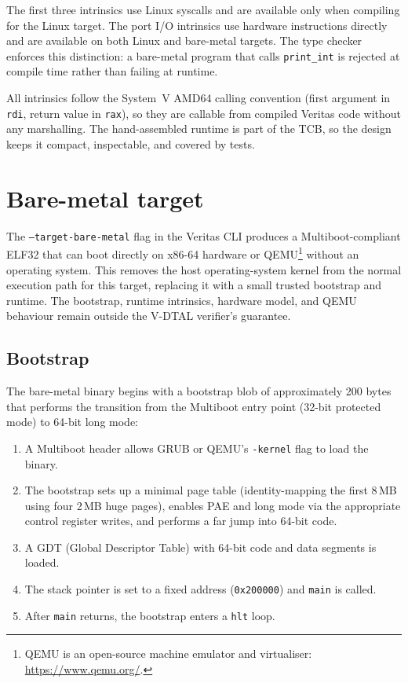 The first three intrinsics use Linux syscalls and are available only when compiling for the Linux target. The port I/O intrinsics use hardware instructions directly and are available on both Linux and bare-metal targets. The type checker enforces this distinction: a bare-metal program that calls \texttt{print\_int} is rejected at compile time rather than failing at runtime.

All intrinsics follow the System~V AMD64 calling convention (first argument in \texttt{rdi}, return value in \texttt{rax}), so they are callable from compiled Veritas code without any marshalling. The hand-assembled runtime is part of the TCB, so the design keeps it compact, inspectable, and covered by tests.

\section{Bare-metal target}\label{sec:unikernel}

The \texttt{--target-bare-metal} flag in the Veritas CLI produces a Multiboot-compliant ELF32 that can boot directly on x86-64 hardware or QEMU\footnote{QEMU is an open-source machine emulator and virtualiser: \url{https://www.qemu.org/}.} without an operating system. This removes the host operating-system kernel from the normal execution path for this target, replacing it with a small trusted bootstrap and runtime. The bootstrap, runtime intrinsics, hardware model, and QEMU behaviour remain outside the V-DTAL verifier's guarantee.

\subsection{Bootstrap}

The bare-metal binary begins with a bootstrap blob of approximately 200 bytes that performs the transition from the Multiboot entry point (32-bit protected mode) to 64-bit long mode:

\begin{enumerate}
  \item A Multiboot header allows GRUB or QEMU's \texttt{-kernel} flag to load the binary.
  \item The bootstrap sets up a minimal page table (identity-mapping the first 8\,MB using four 2\,MB huge pages), enables PAE and long mode via the appropriate control register writes, and performs a far jump into 64-bit code.
  \item A GDT (Global Descriptor Table) with 64-bit code and data segments is loaded.
  \item The stack pointer is set to a fixed address (\texttt{0x200000}) and \texttt{main} is called.
  \item After \texttt{main} returns, the bootstrap enters a \texttt{hlt} loop.
\end{enumerate}

